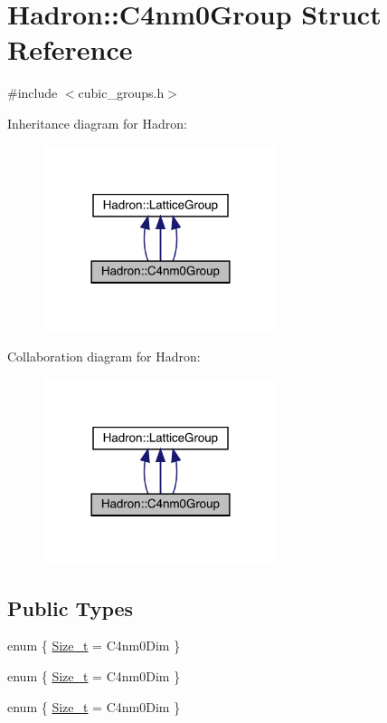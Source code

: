 \hypertarget{structHadron_1_1C4nm0Group}{}\section{Hadron\+:\+:C4nm0\+Group Struct Reference}
\label{structHadron_1_1C4nm0Group}


{\ttfamily \#include $<$cubic\+\_\+groups.\+h$>$}



Inheritance diagram for Hadron\+:
\nopagebreak
\begin{figure}[H]
\begin{center}
\leavevmode
\includegraphics[width=194pt]{da/d73/structHadron_1_1C4nm0Group__inherit__graph}
\end{center}
\end{figure}


Collaboration diagram for Hadron\+:
\nopagebreak
\begin{figure}[H]
\begin{center}
\leavevmode
\includegraphics[width=194pt]{d0/d36/structHadron_1_1C4nm0Group__coll__graph}
\end{center}
\end{figure}
\subsection*{Public Types}
\begin{DoxyCompactItemize}
\item 
enum \{ \mbox{\hyperlink{structHadron_1_1C4nm0Group_a110e530c812df98087e0aa29197c2bd4a1f377c16128ebebc5de3fc9673f8ff0d}{Size\+\_\+t}} = C4nm0\+Dim
 \}
\item 
enum \{ \mbox{\hyperlink{structHadron_1_1C4nm0Group_a110e530c812df98087e0aa29197c2bd4a1f377c16128ebebc5de3fc9673f8ff0d}{Size\+\_\+t}} = C4nm0\+Dim
 \}
\item 
enum \{ \mbox{\hyperlink{structHadron_1_1C4nm0Group_a110e530c812df98087e0aa29197c2bd4a1f377c16128ebebc5de3fc9673f8ff0d}{Size\+\_\+t}} = C4nm0\+Dim
 \}
\end{DoxyCompactItemize}
